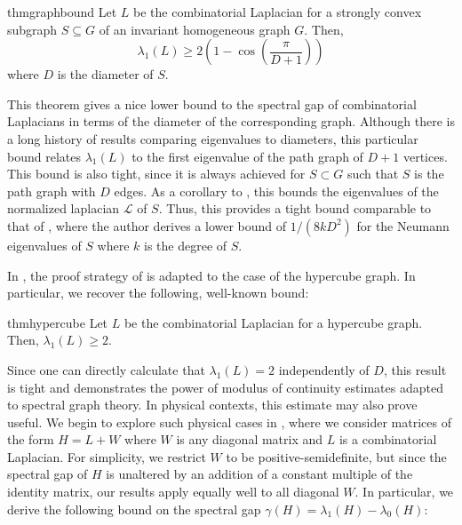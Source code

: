 \begin{restatable}{thm}{graphbound}\label{thm:bound}
 Let $L$ be the combinatorial Laplacian for a strongly convex subgraph $S\subseteq G$ of an invariant homogeneous graph $G$. Then,
 \begin{equation*}
  \lambda_1(L) \geq 2 \left(1 - \cos\left(\frac{\pi}{D+1} \right)\right)
 \end{equation*}
 where $D$ is the diameter of $S$.
\end{restatable}

This theorem gives a nice lower bound to the spectral gap of combinatorial Laplacians in terms of the diameter of the corresponding graph. Although there is a long history of results comparing eigenvalues to diameters, this particular bound relates $\lambda_1(L)$ to the first eigenvalue of the path graph of $D+1$ vertices. This bound is also tight, since it is always achieved for $S \subset G$ such that $S$ is the path graph with $D$ edges. As a corollary to , this bounds the eigenvalues of the normalized laplacian $\mathcal{L}$ of $S$. Thus, this provides a tight bound comparable to that of \cite{Chung1994}, where the author derives a lower bound of $1/(8k D^2)$ for the Neumann eigenvalues of $S$ where $k$ is the degree of $S$.

 In , the proof strategy of  is adapted to the case of the hypercube graph. In particular, we recover the following, well-known bound:
 
\begin{restatable}{thm}{hypercube}\label{thm:hypercube}
	Let $L$ be the combinatorial Laplacian for a hypercube graph. Then, $\lambda_1(L) \geq 2$.
\end{restatable} 

 Since one can directly calculate that $\lambda_1(L)=2$ independently of $D$, this result is tight and demonstrates the power of modulus of continuity estimates adapted to spectral graph theory. In physical contexts, this estimate may also prove useful. We begin to explore such physical cases in , where we consider matrices of the form $H=L+W$ where $W$ is any diagonal matrix and $L$ is a combinatorial Laplacian. For simplicity, we restrict $W$ to be positive-semidefinite, but since the spectral gap of $H$ is unaltered by an addition of a constant multiple of the identity matrix, our results apply equally well to all diagonal $W$. In particular, we derive the following bound on the spectral gap $\gamma(H) = \lambda_1(H)-\lambda_0(H)$:

